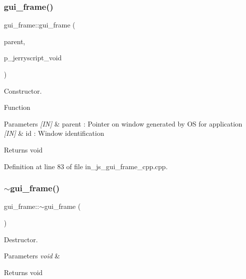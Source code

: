 \mbox{\label{group___g_u_i_ga0e25169b1dedd772f639938a0ee00a6f}} 
\subsubsection{gui\_frame()}
{\footnotesize\ttfamily gui\+\_\+frame\+::gui\+\_\+frame (\begin{DoxyParamCaption}\item[{wx\+Window $\ast$}]{parent,  }\item[{void $\ast$}]{p\+\_\+jerryscript\+\_\+void }\end{DoxyParamCaption})}



Constructor. 

Function
\begin{DoxyParams}{Parameters}
{\em \mbox{[}\+I\+N\mbox{]}} & parent \+: Pointer on window generated by OS for application \\
\hline
{\em \mbox{[}\+I\+N\mbox{]}} & id \+: Window identification \\
\hline
\end{DoxyParams}
\begin{DoxyReturn}{Returns}
void 
\end{DoxyReturn}


Definition at line 83 of file in\+\_\+js\+\_\+gui\+\_\+frame\+\_\+cpp.\+cpp.

\mbox{\label{group___g_u_i_ga5ae0f126eb006a79a2aaf7cb332f3de0}} 
\subsubsection{$\sim$gui\_frame()}
{\footnotesize\ttfamily gui\+\_\+frame\+::$\sim$gui\+\_\+frame (\begin{DoxyParamCaption}{ }\end{DoxyParamCaption})\hspace{0.3cm}{\ttfamily [virtual]}}



Destructor. 


\begin{DoxyParams}{Parameters}
{\em void} & \\
\hline
\end{DoxyParams}
\begin{DoxyReturn}{Returns}
void 
\end{DoxyReturn}


